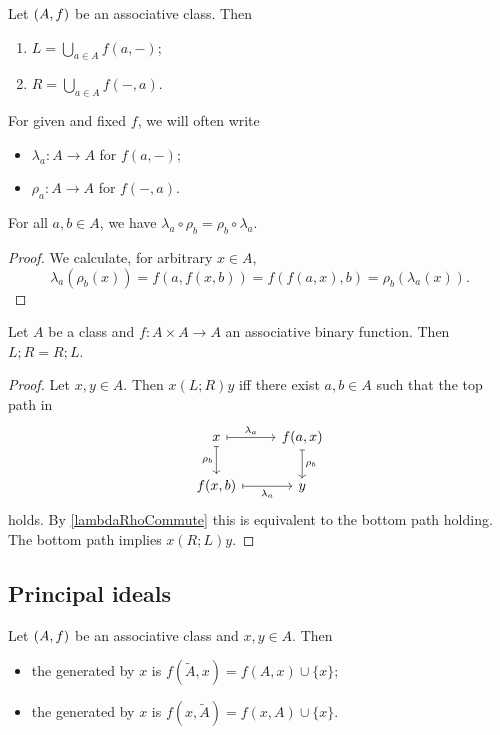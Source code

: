 \begin{lemma}
Let $\left( A, f \right)$ be an associative class. Then
\begin{enumerate}
\item $L = \bigcup_{a\in A}f(a, -)$;
\item $R = \bigcup_{a\in A}f(-, a)$.
\end{enumerate}
\end{lemma}

For given and fixed $f$, we will often write
\begin{itemize}
\item $\lambda_a: A\to A$ for $f(a, -)$;
\item $\rho_a: A\to A$ for $f(-, a)$.
\end{itemize}

\begin{lemma} \label{lambdaRhoCommute}
For all $a,b\in A$, we have $\lambda_a\circ \rho_b = \rho_b \circ \lambda_a$.
\end{lemma}
\begin{proof}
We calculate, for arbitrary $x\in A$,
\[ \lambda_a(\rho_b(x)) = f(a, f(x,b)) = f(f(a,x), b)  = \rho_b(\lambda_a(x)). \]
\end{proof}
\begin{corollary} \label{LRcommute}
Let $A$ be a class and $f: A\times A \to A$ an associative binary function. Then $L;R = R;L$.
\end{corollary}
\begin{proof}
Let $x,y\in A$. Then $x(L;R)y$ iff there exist $a,b\in A$ such that the top path in
\[ \begin{tikzcd}
x \ar[r, maps to, "\lambda_a"] \ar[d, maps to, swap, "\rho_b"] & f(a, x) \ar[d, maps to, "\rho_b"] \\
f(x, b) \ar[r, maps to, swap, "\lambda_a"] & y
\end{tikzcd} \]
holds. By \ref{lambdaRhoCommute} this is equivalent to the bottom path holding. The bottom path implies $x(R;L)y$.
\end{proof}

\subsection{Principal ideals}
\begin{definition}
Let $\left( A, f \right)$ be an associative class and $x, y\in A$. Then
\begin{itemize}
\item the  generated by $x$ is $f(\widetilde{A}, x) = f(A, x)\cup \{x\}$;
\item the  generated by $x$ is $f(x, \widetilde{A}) = f(x,A)\cup \{x\}$.
\end{itemize}
\end{definition}

